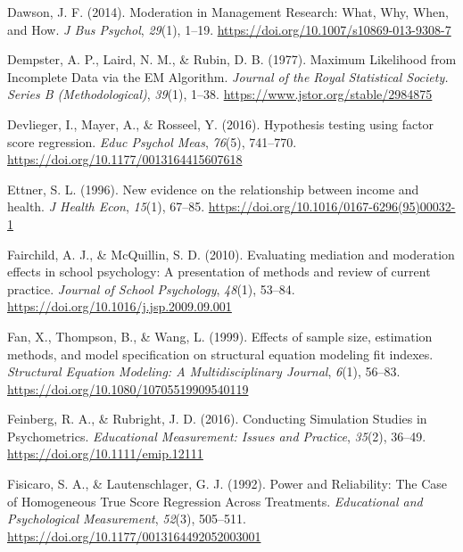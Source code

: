 \documentclass[
  man]{apa6}
\newlength{\cslhangindent}
\newlength{\cslentryspacingunit} %
\newenvironment{CSLReferences}[2] %
 {%
  \setlength{\parindent}{0pt}
  \ifodd #1
  \let\oldpar\par
  \def\par{\hangindent=\cslhangindent\oldpar}
  \fi
  \setlength{\parskip}{#2\cslentryspacingunit}
 }%
 {}
\begin{document}
\begin{CSLReferences}{1}{0}
\leavevmode{}%
Dawson, J. F. (2014). Moderation in {Management Research}: {What}, {Why}, {When}, and {How}. \emph{J Bus Psychol}, \emph{29}(1), 1--19. \url{https://doi.org/10.1007/s10869-013-9308-7}

\leavevmode{}%
Dempster, A. P., Laird, N. M., \& Rubin, D. B. (1977). Maximum {Likelihood} from {Incomplete Data} via the {EM Algorithm}. \emph{Journal of the Royal Statistical Society. Series B (Methodological)}, \emph{39}(1), 1--38. \url{https://www.jstor.org/stable/2984875}

\leavevmode{}%
Devlieger, I., Mayer, A., \& Rosseel, Y. (2016). Hypothesis testing using factor score regression. \emph{Educ Psychol Meas}, \emph{76}(5), 741--770. \url{https://doi.org/10.1177/0013164415607618}

\leavevmode{}%
Ettner, S. L. (1996). New evidence on the relationship between income and health. \emph{J Health Econ}, \emph{15}(1), 67--85. \url{https://doi.org/10.1016/0167-6296(95)00032-1}

\leavevmode{}%
Fairchild, A. J., \& McQuillin, S. D. (2010). Evaluating mediation and moderation effects in school psychology: {A} presentation of methods and review of current practice. \emph{Journal of School Psychology}, \emph{48}(1), 53--84. \url{https://doi.org/10.1016/j.jsp.2009.09.001}

\leavevmode{}%
Fan, X., Thompson, B., \& Wang, L. (1999). Effects of sample size, estimation methods, and model specification on structural equation modeling fit indexes. \emph{Structural Equation Modeling: A Multidisciplinary Journal}, \emph{6}(1), 56--83. \url{https://doi.org/10.1080/10705519909540119}

\leavevmode{}%
Feinberg, R. A., \& Rubright, J. D. (2016). Conducting {Simulation Studies} in {Psychometrics}. \emph{Educational Measurement: Issues and Practice}, \emph{35}(2), 36--49. \url{https://doi.org/10.1111/emip.12111}

\leavevmode{}%
Fisicaro, S. A., \& Lautenschlager, G. J. (1992). Power and {Reliability}: {The Case} of {Homogeneous True Score Regression Across Treatments}. \emph{Educational and Psychological Measurement}, \emph{52}(3), 505--511. \url{https://doi.org/10.1177/0013164492052003001}


\end{CSLReferences}
\end{document}
